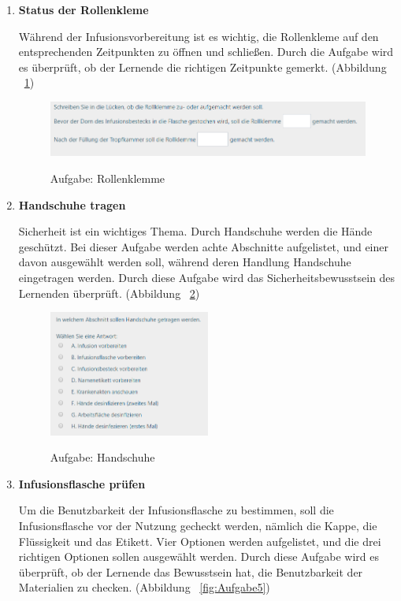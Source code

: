 \begin{enumerate}
    \item \textbf{Status der Rollenkleme}
    
    Während der Infusionsvorbereitung ist es wichtig, die Rollenkleme auf den entsprechenden Zeitpunkten zu öffnen und schließen. Durch die Aufgabe wird es überprüft, ob der Lernende die richtigen Zeitpunkte gemerkt. (Abbildung ~\ref{fig:Aufgabe3})
    
\begin{figure}[ht]
\vspace*{1em}
\centering
\caption{Aufgabe: Rollenklemme}
\includegraphics[width= \textwidth]{images/Aufgabe3.png}
\label{fig:Aufgabe3} 
\end{figure}
    
    \item \textbf{Handschuhe tragen}
    
    Sicherheit ist ein wichtiges Thema. Durch Handschuhe werden die Hände geschützt. Bei dieser Aufgabe werden achte Abschnitte aufgelistet, und einer davon ausgewählt werden soll, während deren Handlung Handschuhe eingetragen werden. Durch diese Aufgabe wird das Sicherheitsbewusstsein des Lernenden überprüft. (Abbildung ~\ref{fig:Aufgabe4})
    
\begin{figure}[ht]
\vspace*{1em}
\centering
\caption{Aufgabe: Handschuhe}
\includegraphics[width= 0.5\textwidth]{images/Aufgabe4.png}
\label{fig:Aufgabe4} 
\end{figure}
    
    \item \textbf{Infusionsflasche prüfen}
    
    Um die Benutzbarkeit der Infusionsflasche zu bestimmen, soll die Infusionsflasche vor der Nutzung gecheckt werden, nämlich die Kappe, die Flüssigkeit und das Etikett. Vier Optionen werden aufgelistet, und die drei richtigen Optionen sollen ausgewählt werden. Durch diese Aufgabe wird es überprüft, ob der Lernende das Bewusstsein hat, die Benutzbarkeit der Materialien zu checken. (Abbildung ~\ref{fig:Aufgabe5})
    

\end{enumerate}

